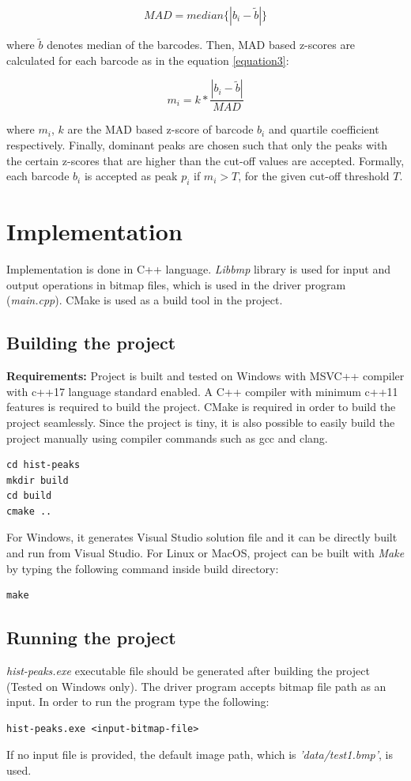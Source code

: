 \documentclass[12pt]{extarticle}
\begin{document}
 \begin{equation}\label{equation2}
     MAD = median\{ \left | b_i - \tilde{b}  \right | \} 
 \end{equation}

where $\tilde{b}$ denotes median of the barcodes. Then, MAD based z-scores are calculated for each barcode as in the equation \eqref{equation3}:

 \begin{equation}\label{equation3}
     m_i = k* \frac{ \left | b_i - \tilde{b}  \right | }{MAD}
 \end{equation}
 
where $m_i$, $k$ are the MAD based z-score of barcode $b_i$ and quartile coefficient respectively. Finally, dominant peaks are chosen such that only the peaks with the certain z-scores that are higher than the cut-off values are accepted. Formally, each barcode $b_i$ is accepted as peak $p_i$ if $ m_i > T $, for the given cut-off threshold $T$.

\section{Implementation}
Implementation is done in C++ language. \textit{Libbmp} library \cite{dickmannbitmap} is used for input and output operations in bitmap files, which is used in the driver program (\textit{main.cpp}). CMake is used as a build tool in the project.
\subsection{Building the project}
\textbf{Requirements:} Project is built and tested on Windows with MSVC++ compiler with c++17 language standard enabled. A C++ compiler with minimum c++11 features is required to build the project. CMake is required in order to build the project seamlessly. Since the project is tiny, it is also possible to easily build the project manually using compiler commands such as gcc and clang.
\begin{verbatim}
cd hist-peaks
mkdir build
cd build
cmake ..
\end{verbatim}
For Windows, it generates Visual Studio solution file and it can be directly built and run from Visual Studio. For Linux or MacOS, project can be built with \textit{Make} by typing the following command inside build directory:
\begin{verbatim}
make
\end{verbatim}
\subsection{Running the project}
\textit{hist-peaks.exe} executable file should be generated after building the project (Tested on Windows only). The driver program accepts bitmap file path as an input. In order to run the program type the following:
\begin{verbatim}
hist-peaks.exe <input-bitmap-file>
\end{verbatim}
 If no input file is provided, the default image path, which is \textit{'data/test1.bmp'}, is used.
 


\end{document}
